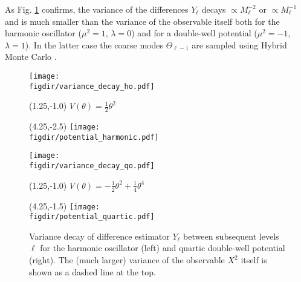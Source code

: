 \documentclass[11pt]{article}
\newcommand{\figdir}{./figures/}
\begin{document}
As Fig. \ref{fig:quantum_results} confirms, the variance of the differences $Y_\ell$ decays $\propto M_\ell^{-2}$ or $\propto M_\ell^{-1}$ and is much smaller than the variance of the observable itself both for the harmonic oscillator ($\mu^2=1$, $\lambda=0$) and for a double-well potential ($\mu^2=-1$, $\lambda=1$). In the latter case the coarse modes $\Theta_{\ell-1}$ are sampled using Hybrid Monte Carlo \cite{Duane1987}.
\begin{figure}
  \begin{center}
  \begin{minipage}{0.45\linewidth}
    \texttt{[image: \\figdir/variance\_decay\_ho.pdf]}
    \begin{textblock}{4.0}(1.25,-1.0)
      $V(\theta)=\frac{1}{2}\theta^2$
    \end{textblock}
    \begin{textblock}{4.0}(4.25,-2.5)
      \texttt{[image: \\figdir/potential\_harmonic.pdf]}
    \end{textblock}
  \end{minipage}
  \hfill
  \begin{minipage}{0.45\linewidth}
    \texttt{[image: \\figdir/variance\_decay\_qo.pdf]}
    \begin{textblock}{4.0}(1.25,-1.0)
      $V(\theta)=-\frac{1}{2}\theta^2+\frac{1}{4}\theta^4$
    \end{textblock}
    \begin{textblock}{4.0}(4.25,-1.5)
      \texttt{[image: \\figdir/potential\_quartic.pdf]}
    \end{textblock}
  \end{minipage}
  \caption{Variance decay of difference estimator $Y_\ell$ between subsequent levels $\ell$ for the harmonic oscillator (left) and quartic double-well potential (right). The (much larger) variance of the observable $X^2$ itself is shown as a dashed line at the top.}
  \label{fig:quantum_results}
  \end{center}
\end{figure}
\end{document}
